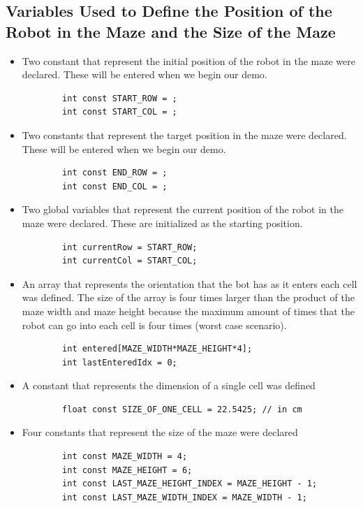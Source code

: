 \documentclass[11pt]{article}
\begin{document}
\subsection{Variables Used to Define the Position of the Robot in the Maze and the Size of the Maze}
\begin{itemize}
\item Two constant that represent the initial position of the robot in the maze were declared. These will be entered when we begin our demo.
	\begin{verbatim}
		int const START_ROW = ;
		int const START_COL = ;
	\end{verbatim} 
\item Two constants that represent the target position in the maze were declared. These will be entered when we begin our demo.
	\begin{verbatim}
		int const END_ROW = ; 
		int const END_COL = ;
	\end{verbatim}
\item Two global variables that represent the current position of the robot in the maze were declared. These are  initialized as the starting position. 
	\begin{verbatim}
		int currentRow = START_ROW;
		int currentCol = START_COL;
	\end{verbatim} 
\item An array that represents the orientation that the bot has as it enters each cell was defined. The size of the array is four times larger than the product of the maze width and maze height because the maximum amount of times that the robot can go into each cell is four times (worst case scenario).
	\begin{verbatim}
		int entered[MAZE_WIDTH*MAZE_HEIGHT*4];
		int lastEnteredIdx = 0;
	\end{verbatim} 
\item A constant that represents the dimension of a single cell was defined
	\begin{verbatim}
		float const SIZE_OF_ONE_CELL = 22.5425; // in cm 	
	\end{verbatim} 
\item Four constants that represent the size of the maze were declared
	\begin{verbatim}
		int const MAZE_WIDTH = 4;
		int const MAZE_HEIGHT = 6;
		int const LAST_MAZE_HEIGHT_INDEX = MAZE_HEIGHT - 1;
		int const LAST_MAZE_WIDTH_INDEX = MAZE_WIDTH - 1;
	\end{verbatim} 
\end{itemize}
\newpage
\end{document}
